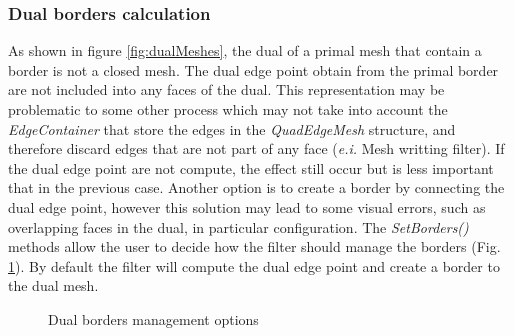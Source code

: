 \documentclass{InsightArticle}
\begin{document}
\subsubsection{Dual borders calculation}
As shown in figure \ref{fig:dualMeshes}, the dual of a primal mesh that contain a border is not a closed mesh. The dual edge point obtain from the primal border are not included into any faces of the dual. This representation may be problematic to some other process which may not take into account the \emph{EdgeContainer} that store the edges in the \emph{QuadEdgeMesh} structure, and therefore discard edges that are not part of any face (\emph{e.i.} Mesh writting filter). If the dual edge point are not compute, the effect still occur but is less important that in the previous case. Another option is to create a border by connecting the dual edge point, however this solution may lead to some visual errors, such as overlapping faces in the dual, in particular configuration. The \emph{SetBorders()} methods allow the user to decide how the filter should manage the borders (Fig. \ref{fig:BorderManagment}). By default the filter will compute the dual edge point and create a border to the dual mesh.
\begin{figure}
	\centering
	\caption{Dual borders management options}
	\label{fig:BorderManagment}
\end{figure}
\end{document}
